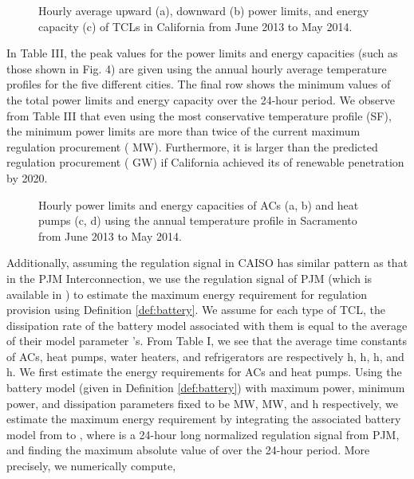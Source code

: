 \documentclass[onecolumn,journal]{IEEEtran}
\begin{document}
\begin{figure}[tb]
\centering
{}
\caption{Hourly average upward (a), downward (b) power limits, and energy capacity (c) of TCLs in California  from June 2013 to May 2014. }
\label{fig:est_capacity}
\end{figure}

In Table III, the peak values for the power limits and energy capacities (such as those shown in Fig.  4) are given using the annual hourly average temperature profiles for the five different cities. The final row shows the minimum values of the total power limits and energy capacity over the 24-hour period. We observe from Table III that even using the most conservative temperature profile (SF), the minimum power limits are more than twice of the current maximum regulation procurement ( MW). Furthermore, it is larger than the  predicted regulation procurement ( GW) if California achieved its  of renewable penetration by 2020. 

\begin{figure}[tb]
\centering
{}
\caption{Hourly power limits and energy capacities of ACs (a, b) and heat pumps (c, d) using the annual temperature profile in Sacramento from June 2013 to May 2014. }\label{fig:yearly_capacity_SA}
\end{figure}

Additionally, assuming the regulation signal in \ac{CAISO} has similar pattern as that in the \ac{PJM} Interconnection, we use the regulation signal of \ac{PJM} (which is available in \cite{PJM}) to estimate the maximum energy requirement for regulation provision using Definition \ref{def:battery}. We assume for each type of \ac{TCL}, the dissipation rate  of the battery model associated with them is equal to the average of their model parameter 's. From Table I, we see that  the average time constants of ACs, heat pumps, water heaters, and refrigerators are respectively  h,  h,  h, and  h. We first estimate the energy requirements for ACs and heat pumps. Using the battery model (given in Definition \ref{def:battery}) with maximum power, minimum power, and dissipation parameters fixed to be  MW,  MW, and  h respectively, we estimate the maximum energy requirement  by integrating the associated battery model   from  to , where  is a 24-hour long normalized regulation signal from PJM, and finding the maximum absolute value of  over the 24-hour period. More precisely, we numerically compute,
\end{document}
